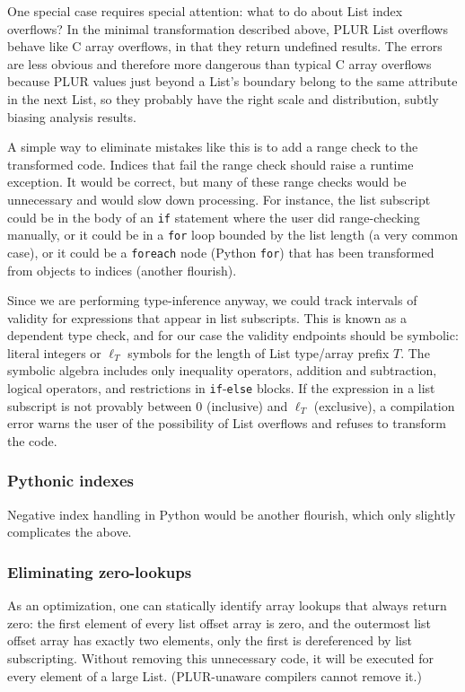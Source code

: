 \documentclass[10pt, conference, compsocconf]{IEEEtran}
\begin{document}
One special case requires special attention: what to do about List index overflows? In the minimal transformation described above, PLUR List overflows behave like C array overflows, in that they return undefined results. The errors are less obvious and therefore more dangerous than typical C array overflows because PLUR values just beyond a List's boundary belong to the same attribute in the next List, so they probably have the right scale and distribution, subtly biasing analysis results.

A simple way to eliminate mistakes like this is to add a range check to the transformed code. Indices that fail the range check should raise a runtime exception. It would be correct, but many of these range checks would be unnecessary and would slow down processing. For instance, the list subscript could be in the body of an {\tt if} statement where the user did range-checking manually, or it could be in a {\tt for} loop bounded by the list length (a very common case), or it could be a {\tt foreach} node (Python {\tt for}) that has been transformed from objects to indices (another flourish).

Since we are performing type-inference anyway, we could track intervals of validity for expressions that appear in list subscripts. This is known as a dependent type check, and for our case the validity endpoints should be symbolic: literal integers or $\ell_T$ symbols for the length of List type/array prefix $T$. The symbolic algebra includes only inequality operators, addition and subtraction, logical operators, and restrictions in {\tt if}-{\tt else} blocks. If the expression in a list subscript is not provably between 0 (inclusive) and $\ell_T$ (exclusive), a compilation error warns the user of the possibility of List overflows and refuses to transform the code.

\subsubsection{Pythonic indexes}

Negative index handling in Python would be another flourish, which only slightly complicates the above.

\subsubsection{Eliminating zero-lookups}

As an optimization, one can statically identify array lookups that always return zero: the first element of every list offset array is zero, and the outermost list offset array has exactly two elements, only the first is dereferenced by list subscripting. Without removing this unnecessary code, it will be executed for every element of a large List. (PLUR-unaware compilers cannot remove it.)
\end{document}

